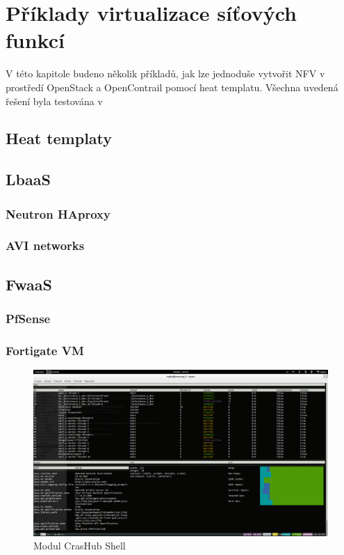 \chapter{Příklady virtualizace síťových funkcí}

V této kapitole budeno několik příkladů, jak lze jednoduše vytvořit NFV v prostředí OpenStack a OpenContrail pomocí heat templatu. Všechna uvedená řešení byla testována v 

\section{Heat templaty}\label{sub:interaction}



\section{LbaaS}\label{sub:interaction}

\subsection{Neutron HAproxy}\label{sub:interaction}

\subsection{AVI networks}\label{sub:interaction}

\section{FwaaS}\label{sub:interaction}

\subsection{PfSense}\label{sub:interaction}

\subsection{Fortigate VM}\label{sub:interaction}


\begin{figure}[h]
\begin{centering}
\includegraphics[scale=0.21]{images/real_interaction}
\par\end{centering}
\caption{Modul CrasHub Shell\label{fig:real_interaction}}
\end{figure}
